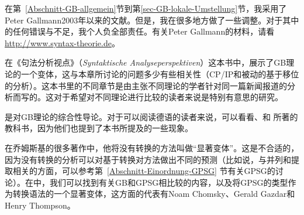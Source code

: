 在第~\ref{Abschnitt-GB-allgemein}节到第\ref{sec-GB-lokale-Umstellung}节，我采用了Peter Gallmann2003年以来的文献。但是，我在很多地方做了一些调整。对于其中的任何错误与不足，我个人负全部责任。有关Peter Gallmann的材料，请看\url{http://www.syntax-theorie.de}。

在《句法分析视点》（\emph{Syntaktische Analyseperspektiven}）这本书中，\citet{Lohnstein2014a}展示了GB理论的一个变体，这与本章所讨论的问题多少有些相关性（CP/IP和被动的基于移位的分析）。这本书里的不同章节是由主张不同理论的学者针对同一篇新闻报道的分析而写的。这对于希望对不同理论进行比较的读者来说是特别有意思的研究。

是对GB理论的综合性导论。对于可以阅读德语的读者来说，可以看看、和 所著的教科书，因为他们也提到了本书所提及的一些现象。

在乔姆斯基的很多著作中，他将没有转换的方法叫做``显著变体''。这是不合适的，因为没有转换的分析可以对基于转换对方法做出不同的预测（比如说，与并列和提取相关的方面，可以参考第~\ref{Abschnitt-Einordnung-GPSG} 节有关GPSG的讨论）。在中，我们可以找到有关GB和GPSG相比较的内容，以及将GPSG的类型作为转换语法的一个显著变体，这方面的代表有Noam Chomsky、Gerald Gazdar和Henry Thompson。

